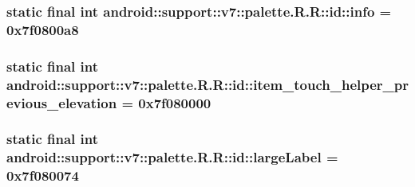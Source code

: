 \hypertarget{classandroid_1_1support_1_1v7_1_1palette_1_1_r_1_1id_ae263f1eca9978cea8fad30514280a93}{
\subsubsection[{info}]{\setlength{\rightskip}{0pt plus 5cm}static final int android::support::v7::palette.R.R::id::info = 0x7f0800a8}}
\label{classandroid_1_1support_1_1v7_1_1palette_1_1_r_1_1id_ae263f1eca9978cea8fad30514280a93}


\hypertarget{classandroid_1_1support_1_1v7_1_1palette_1_1_r_1_1id_256e13036530ab5cdd066c22c110e665}{
\subsubsection[{item\_\-touch\_\-helper\_\-previous\_\-elevation}]{\setlength{\rightskip}{0pt plus 5cm}static final int android::support::v7::palette.R.R::id::item\_\-touch\_\-helper\_\-previous\_\-elevation = 0x7f080000}}
\label{classandroid_1_1support_1_1v7_1_1palette_1_1_r_1_1id_256e13036530ab5cdd066c22c110e665}


\hypertarget{classandroid_1_1support_1_1v7_1_1palette_1_1_r_1_1id_735c953380990e99486896925e5ef2f3}{
\subsubsection[{largeLabel}]{\setlength{\rightskip}{0pt plus 5cm}static final int android::support::v7::palette.R.R::id::largeLabel = 0x7f080074}}
\label{classandroid_1_1support_1_1v7_1_1palette_1_1_r_1_1id_735c953380990e99486896925e5ef2f3}


